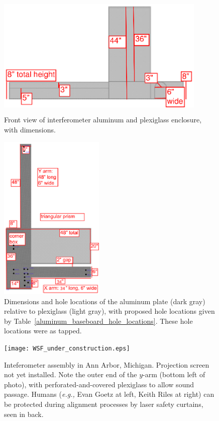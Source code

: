         \begin{figure}
        \begin{center}
        \includegraphics[height=60mm, width=100mm]{view-front.eps}
        \caption{Front view of interferometer aluminum and plexiglass enclosure, with dimensions.}
        \label{plex-view-front}
        \end{center}
        \end{figure}



        \begin{figure}
        \begin{center}
        \includegraphics[height=80mm, width=50mm]{view-top-plate-3.eps}
        \caption{Dimensions and hole locations of the aluminum plate (dark gray) relative to plexiglass (light gray), with proposed hole locations given by Table~\ref{aluminum_baseboard_hole_locations}. These hole locations were as tapped.}
        \label{al_top_plate}
        \end{center}
        \end{figure}


	\begin{figure}
	\begin{center}
	\texttt{[image: WSF\_under\_construction.eps]}
	\caption{Inteferometer assembly in Ann Arbor, Michigan. Projection screen not yet installed. Note the outer end of the $y$-arm (bottom left of photo), with perforated-and-covered plexiglass to allow sound passage. Humans (\textit{e.g.,} Evan Goetz at left, Keith Riles at right) can be protected during alignment processes by laser safety curtains, seen in back.}
	\label{WSF_in_AA}
	\end{center}
	\end{figure}

